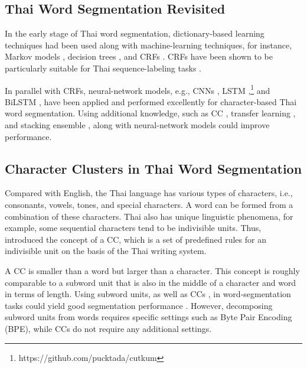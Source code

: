 \subsection{Thai Word Segmentation Revisited}

In the early stage of Thai word segmentation, dictionary-based learning techniques had been used along with machine-learning techniques, for instance, Markov models \cite{Kawtrakul1997}, decision trees \cite{Sornlertlamvanich2000,Theeramunkong2001}, and CRFs \cite{Haruechaiyasak2008}.
%
CRFs have been shown to be particularly suitable for Thai sequence-labeling tasks \cite{Kruengkrai2006,Haruechaiyasak2009,Kruengkrai2009,Nararatwong2018}.
%

In parallel with CRFs, neural-network models, e.g., CNNs \cite{Kittinaradorn2019,Chormai2019}, LSTM \cite{Treeratpituk2017},\footnote{https://github.com/pucktada/cutkum} and BiLSTM \cite{Jousimo2017}, have been applied and performed excellently for character-based Thai word segmentation.
%
Using additional knowledge, such as CC \cite{Lapjaturapit2018,Nararatwong2018}, transfer learning \cite{seeha-etal-2020-thailmcut}, and stacking ensemble \cite{limkonchotiwat-etal-2020-domain,limkonchotiwat-etal-2021-handling}, along with neural-network models could improve performance.
%

\subsection{Character Clusters in Thai Word Segmentation}
Compared with English, the Thai language has various types of characters, i.e., consonants, vowels, tones, and special characters.
%
A word can be formed from a combination of these characters.
%
Thai also has unique linguistic phenomena, for example, some sequential characters tend to be indivisible units.
%
Thus,  introduced the concept of a CC, which is a set of predefined rules for an indivisible unit on the basis of the Thai writing system.
%

A CC is smaller than a word but larger than a character.
%
This concept is roughly comparable to a subword unit that is also in the middle of a character and word in terms of length. 
%
Using subword units, as well as CCs \cite{Theeramunkong2004,Sutantayawalee2015,Lapjaturapit2018,Nararatwong2018}, in word-segmentation tasks could yield good segmentation performance \cite{yang-etal-2019-subword,li-etal-2019-word-segmentation}.
%
However, decomposing subword units from words requires specific settings such as Byte Pair Encoding (BPE), while CCs do not require any additional settings.
%

